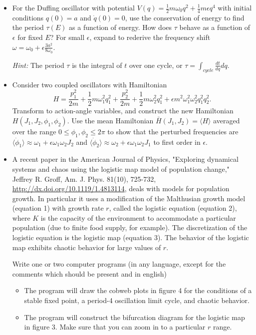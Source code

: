 \documentclass[letterpaper,11pt]{article}
\begin{document}
\begin{itemize}
 \item For the Duffing oscillator with potential $V(q) = \frac{1}{2} m \omega_0 q^2 + \frac{1}{4} m \epsilon q^4$ with initial conditions $q(0) = a$ and $\dot{q}(0) = 0$, use the conservation of energy to find the period $\tau(E)$ as a function of energy.  How does $\tau$ behave as a function of $\epsilon$ for fixed $E$?  For small $\epsilon$, expand to rederive the frequency shift $\omega = \omega_0 + \epsilon \frac{3a^2}{8\omega_0}$.
 
 \textit{Hint:} The period $\tau$ is the integral of $t$ over one cycle, or $\tau = \int_{cycle} \frac{dt}{dq} dq$.
 
 \item Consider two coupled oscillators with Hamiltonian
 \begin{equation*}
  H = \frac{p_1^2}{2m} + \frac{1}{2} m \omega_1^2 q_1^2 + \frac{p_2^2}{2m} + \frac{1}{2} m \omega_2^2 q_1^2 + \epsilon m^2 \omega_1^2 \omega_2^2 q_1^2 q_2^2.
 \end{equation*}
 Transform to action-angle variables, and construct the new Hamiltonian $H(J_1, J_2, \phi_1, \phi_2)$.  Use the mean Hamiltonian $\bar{H}(J_1,J_2) = \langle H \rangle$ averaged over the range $0 \le \phi_1,\phi_2 \le 2\pi$ to show that the perturbed frequencies are $\langle \dot\phi_1 \rangle \approx \omega_1 + \epsilon \omega_1 \omega_2 J_2$ and $\langle \dot\phi_2 \rangle \approx \omega_2 + \epsilon \omega_1 \omega_2 J_1$ to first order in $\epsilon$.

 \item A recent paper in the American Journal of Physics, "Exploring dynamical systems and chaos using the logistic map model of population change," Jeffrey R. Groff, Am. J. Phys. 81(10), 725-732, \url{http://dx.doi.org/10.1119/1.4813114}, deals with models for population growth.  In particular it uses a modification of the Malthusian growth model (equation 1) with growth rate $r$, called the logistic equation (equation 2), where $K$ is the capacity of the environment to accommodate a particular population (due to finite food supply, for example).  The discretization of the logistic equation is the logistic map (equation 3).  The behavior of the logistic map exhibits chaotic behavior for large values of $r$.
 
 Write one or two computer programs (in any language, except for the comments which should be present and in english)

 \begin{itemize}
  \item The program will draw the cobweb plots in figure 4 for the conditions of a stable fixed point, a period-4 oscillation limit cycle, and chaotic behavior. 
  \item The program will construct the bifurcation diagram for the logistic map in figure 3.  Make sure that you can zoom in to a particular $r$ range.
 \end{itemize}
 

\end{itemize}
\end{document}
